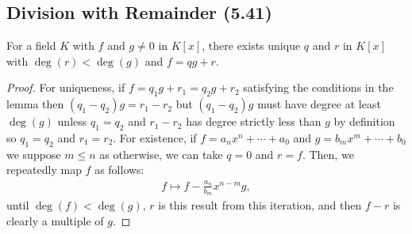 \subsection{Division with Remainder (5.41)} \label{5.41}

For a field $K$ with $f$ and $g \neq 0$ in $K[x]$, there exists unique
$q$ and $r$ in $K[x]$ with $\deg(r) < \deg(g)$ and $f = qg + r$.

\begin{proof}
    For uniqueness, if $f = q_1g + r_1 = q_2g + r_2$ satisfying the
    conditions in the lemma then $(q_1 - q_2)g = r_1 - r_2$ but
    $(q_1 - q_2)g$ must have degree at least $\deg(g)$ unless $q_1 = q_2$
    and $r_1 - r_2$ has degree strictly less than $g$ by definition
    so $q_1 = q_2$ and $r_1 = r_2$.
    \bs
    For existence, if $f = a_nx^n + \cdots + a_0$ and 
    $g = b_mx^m + \cdots + b_0$ we suppose $m \leq n$
    as otherwise, we can take $q = 0$ and $r = f$.
    Then, we repeatedly map $f$ as follows: \begin{align*}
        f \mapsto f - \frac{a_n}{b_m}x^{n - m}g,
    \end{align*} until $\deg(f) < \deg(g)$, $r$ is this result from
    this iteration, and then $f - r$ is clearly a multiple of $g$.
\end{proof}

